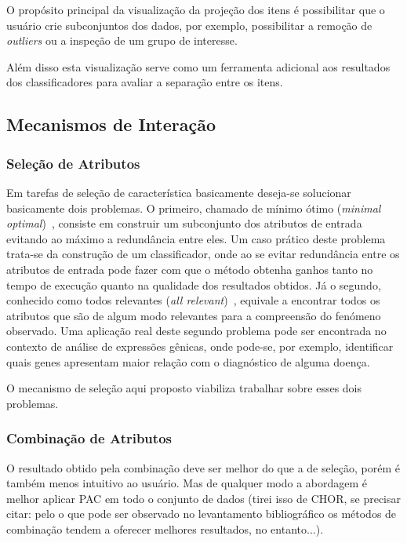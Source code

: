 O propósito principal da visualização da projeção dos itens é possibilitar que o usuário crie subconjuntos dos dados, por exemplo, possibilitar a remoção de \emph{outliers} ou a inspeção de um grupo de interesse.

Além disso esta visualização serve como um ferramenta adicional aos resultados dos classificadores para avaliar a separação entre os itens.


\subsection{Mecanismos de Interação}

\subsubsection{Seleção de Atributos}

Em tarefas de seleção de característica basicamente deseja-se solucionar basicamente dois problemas. 
O primeiro, chamado de mínimo ótimo (\emph{minimal optimal})~\cite{Kohavi1997}, consiste em construir um subconjunto dos atributos de entrada evitando ao máximo a redundância entre eles. 
Um caso prático deste problema trata-se da construção de um classificador, onde ao se evitar redundância entre os atributos de entrada pode fazer com que o método obtenha ganhos tanto no tempo de execução quanto na qualidade dos resultados obtidos. 
Já o segundo, conhecido como todos relevantes (\emph{all relevant})~\cite{Nilsson2007}, equivale a encontrar todos os atributos que são de algum modo relevantes para a compreensão do fenómeno observado. 
Uma aplicação real deste segundo problema pode ser encontrada no contexto de análise de expressões gênicas, onde pode-se, por exemplo, identificar quais genes apresentam maior relação com o diagnóstico de alguma doença. 

O mecanismo de seleção aqui proposto viabiliza trabalhar sobre esses dois problemas.

\subsubsection{Combinação de Atributos}

O resultado obtido pela combinação deve ser melhor do que a de seleção, porém é também menos intuitivo ao usuário. Mas de qualquer modo a abordagem é melhor aplicar PAC em todo o conjunto de dados (tirei isso de CHOR, se precisar citar: pelo o que pode ser observado no levantamento bibliográfico os métodos de combinação tendem a oferecer melhores resultados, no entanto...).  

